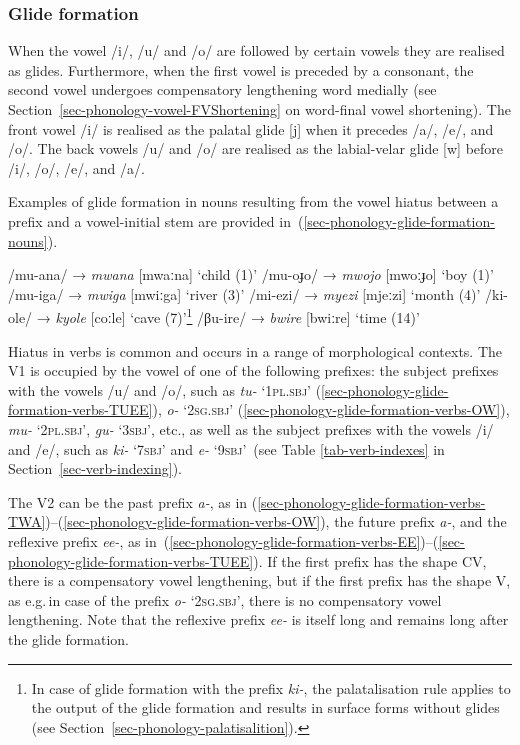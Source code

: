 \subsubsection{Glide formation}\label{sec-phonology-glide-formation}

When the vowel /i/, /u/ and /o/ are followed by certain vowels they are realised as glides. 
Furthermore, when the first vowel is preceded by a consonant, the second vowel undergoes compensatory lengthening word medially (see Section~\ref{sec-phonology-vowel-FVShortening} on word-final vowel shortening). 
The front vowel /i/ is realised as the palatal glide [j] when it precedes /a/, /e/, and /o/. 
The back vowels /u/ and /o/ are realised as the labial-velar glide [w] before /i/, /o/, /e/, and /a/.

Examples of glide formation in nouns resulting from the vowel hiatus between a prefix and a vowel-initial stem are provided in~(\ref{sec-phonology-glide-formation-nouns}).

\ea \label{sec-phonology-glide-formation-nouns}
\begin{xlist}	
	\ex 	/mu-ana/ →  \textit{mwana} [mwaːna] `child (1)'
	\ex 	/mu-oɟo/ →  \textit{mwojo} [mwoːɟo] `boy (1)'
	\ex 	/mu-iga/ →  \textit{mwiga} [mwiːga] `river (3)'
	\ex 	/mi-ezi/ →  \textit{myezi}  [mjeːzi] `month (4)' 
	\ex 	/ki-ole/ →  \textit{kyole} [coːle] `cave (7)'\footnote{In case of glide formation with the prefix  \textit{ki-}, the palatalisation rule applies to the output of the glide formation and results in surface forms without glides (see Section~\ref{sec-phonology-palatisalition}).}
	\ex 	/βu-ire/ →  \textit{bwire} [bwiːre] `time (14)'
\end{xlist}	
\z

Hiatus in verbs is common and occurs in a range of morphological contexts. 
The V1 is occupied by the vowel of one of the following prefixes:  
the subject prefixes with the vowels /u/ and /o/, such as  \textit{tu-} `1\textsc{pl.sbj}' (\ref{sec-phonology-glide-formation-verbs-TUEE}), 
 \textit{o-} `2\textsc{sg.sbj}' (\ref{sec-phonology-glide-formation-verbs-OW}), 
 \textit{mu-} `2\textsc{pl.sbj}',  \textit{gu-} `3\textsc{sbj}', etc., 
as well as the subject prefixes with the vowels /i/ and /e/, such as  \textit{ki-} `7\textsc{sbj}' and  \textit{e-} `9\textsc{sbj}' \,(see Table \ref{tab-verb-indexes} in Section~\ref{sec-verb-indexing}). 

The V2 can be the past prefix  \textit{a-}, as in (\ref{sec-phonology-glide-formation-verbs-TWA})–(\ref{sec-phonology-glide-formation-verbs-OW}), 
the future prefix  \textit{a-}, and the reflexive prefix  \textit{ee-}, as in~(\ref{sec-phonology-glide-formation-verbs-EE})–(\ref{sec-phonology-glide-formation-verbs-TUEE}).
If the first prefix has the shape CV, there is a compensatory vowel lengthening, 
but if the first prefix has the shape V, as e.g.\,in case of the prefix  \textit{o-} `2\textsc{sg.sbj}', there is no compensatory vowel lengthening. 
Note that the reflexive prefix  \textit{ee-} is itself long and remains long after the glide formation.

